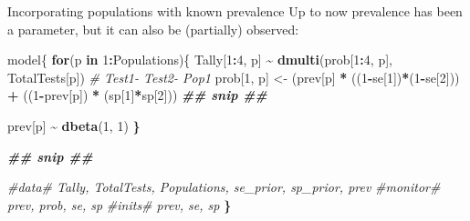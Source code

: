 \documentclass[
  ignorenonframetext,
]{beamer}
\newenvironment{Shaded}{\begin{snugshade}}{\end{snugshade}}
\newcommand{\CommentTok}[1]{\textcolor[rgb]{0.56,0.35,0.01}{\textit{#1}}}
\newcommand{\ControlFlowTok}[1]{\textcolor[rgb]{0.13,0.29,0.53}{\textbf{#1}}}
\newcommand{\DecValTok}[1]{\textcolor[rgb]{0.00,0.00,0.81}{#1}}
\newcommand{\DocumentationTok}[1]{\textcolor[rgb]{0.56,0.35,0.01}{\textbf{\textit{#1}}}}
\newcommand{\ErrorTok}[1]{\textcolor[rgb]{0.64,0.00,0.00}{\textbf{#1}}}
\newcommand{\FunctionTok}[1]{\textcolor[rgb]{0.13,0.29,0.53}{\textbf{#1}}}
\newcommand{\NormalTok}[1]{#1}
\newcommand{\OtherTok}[1]{\textcolor[rgb]{0.56,0.35,0.01}{#1}}
\newcommand{\SpecialCharTok}[1]{\textcolor[rgb]{0.81,0.36,0.00}{\textbf{#1}}}
\begin{document}
\begin{frame}[fragile]
\begin{block}{Incorporating populations with known prevalence}
\protect\hypertarget{incorporating-populations-with-known-prevalence}{}
Up to now prevalence has been a parameter, but it can also be
(partially) observed:

\scriptsize

\begin{Shaded}
\begin{Highlighting}[]
\NormalTok{model\{}
  \ControlFlowTok{for}\NormalTok{(p }\ControlFlowTok{in} \DecValTok{1}\SpecialCharTok{:}\NormalTok{Populations)\{}
\NormalTok{    Tally[}\DecValTok{1}\SpecialCharTok{:}\DecValTok{4}\NormalTok{, p] }\SpecialCharTok{\textasciitilde{}} \FunctionTok{dmulti}\NormalTok{(prob[}\DecValTok{1}\SpecialCharTok{:}\DecValTok{4}\NormalTok{, p], TotalTests[p])}
    \CommentTok{\# Test1{-} Test2{-} Pop1}
\NormalTok{    prob[}\DecValTok{1}\NormalTok{, p] }\OtherTok{\textless{}{-}}\NormalTok{ (prev[p] }\SpecialCharTok{*}\NormalTok{ ((}\DecValTok{1}\SpecialCharTok{{-}}\NormalTok{se[}\DecValTok{1}\NormalTok{])}\SpecialCharTok{*}\NormalTok{(}\DecValTok{1}\SpecialCharTok{{-}}\NormalTok{se[}\DecValTok{2}\NormalTok{])) }\SpecialCharTok{+}\NormalTok{ ((}\DecValTok{1}\SpecialCharTok{{-}}\NormalTok{prev[p]) }\SpecialCharTok{*}\NormalTok{ (sp[}\DecValTok{1}\NormalTok{]}\SpecialCharTok{*}\NormalTok{sp[}\DecValTok{2}\NormalTok{]))}
    \DocumentationTok{\#\# snip \#\#}
      
\NormalTok{    prev[p] }\SpecialCharTok{\textasciitilde{}} \FunctionTok{dbeta}\NormalTok{(}\DecValTok{1}\NormalTok{, }\DecValTok{1}\NormalTok{)}
  \ErrorTok{\}}

  \DocumentationTok{\#\# snip \#\#}

  \CommentTok{\#data\# Tally, TotalTests, Populations, se\_prior, sp\_prior, prev}
  \CommentTok{\#monitor\# prev, prob, se, sp}
  \CommentTok{\#inits\# prev, se, sp}
\ErrorTok{\}}
\end{Highlighting}
\end{Shaded}

\normalsize
\end{block}
\end{frame}
\end{document}
